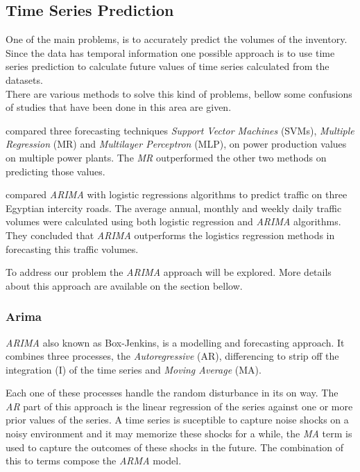 \subsection{Time Series Prediction}\label{sec:tsp} One of the main problems, is
to accurately predict the volumes of the inventory. Since the data has temporal
information one possible approach is to use time series prediction to calculate
future values of time series calculated from the datasets. \\

There are various methods to solve this kind of problems, bellow some confusions
of studies that have been done in this area are given.

\cite{1716527} compared three forecasting techniques \emph{Support Vector
Machines} (SVMs), \emph{Multiple Regression} (MR) and \emph{Multilayer
Perceptron} (MLP), on power production values on multiple power plants. The
\emph{MR} outperformed the other two methods on predicting those values. 

\cite{Sabry:2007kq} compared \emph{ARIMA} with logistic regressions algorithms
to predict traffic on three Egyptian intercity roads. The average annual,
monthly and weekly daily traffic volumes were calculated using both logistic
regression and \emph{ARIMA} algorithms. They concluded that \emph{ARIMA}
outperforms the logistics regression methods in forecasting this traffic
volumes.

To address our problem the \emph{ARIMA} approach will be explored. More details
about this approach are available on the section bellow.

\subsubsection{Arima} \emph{ARIMA} also known as Box-Jenkins, is a modelling and
forecasting approach. It combines three processes, the \emph{Autoregressive}
(AR), differencing to strip off the integration (I) of the time series and
\emph{Moving Average} (MA).

Each one of these processes handle the random disturbance in its on
way.\cite{Sabry:2007kq} The \emph{AR} part of this approach is the linear
regression of the series against one or more prior values of the series. A time
series is suceptible to capture noise shocks on a noisy environment and it may
memorize these shocks for a while, the \emph{MA} term is used to capture the
outcomes of these shocks in the future.\cite{1578206} The combination of this to
terms compose the \emph{ARMA} model.

